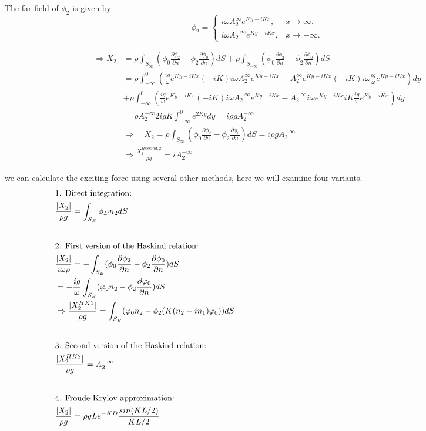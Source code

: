 \documentclass[a4paper,10pt]{article}
\newcommand{\dd}{\partial}
\begin{document}
The far field of $\phi_2$ is given by
\begin{equation} \label{int.eq.}
	\phi_2 = \begin{cases}
		i \omega A_2^\infty e^{Ky - iKx}, & x \rightarrow \infty.\\
		i \omega A_2^{-\infty} e^{Ky + iKx}, & x \rightarrow -\infty.
	\end{cases} 
\end{equation}

\begin{align}
\Rightarrow X_2 &= \rho \int_{S_\infty} (\phi_0 \frac{\dd \phi_2}{\dd n} - \phi_2 \frac{\dd \phi_0}{\dd n}) dS + \rho \int_{S_{-\infty}} (\phi_0 \frac{\dd \phi_2}{\dd n} - \phi_2 \frac{\dd \phi_0}{\dd n}) dS\\
& = \rho \int_{-\infty}^0 (\frac{i g}{\omega} e^{Ky-iKx} (-iK) i \omega A_2^\infty e^{Ky -iKx} - A_2^\infty e^{Ky -iKx}(-iK) i \omega \frac{ig}{\omega} e^{Ky-iKx}) dy\\
& + \rho \int_{-\infty}^0 (\frac{ig}{\omega}e^{Ky-iKx} (-iK) i\omega A_2^{-\infty} e^{Ky+iKx} -A_2^{-\infty} i \omega e^{Ky+iKx} iK \frac{ig}{\omega} e^{Ky-iKx} ) dy\\
& = \rho A_2^{-\infty} 2 ig K \int_{-\infty}^0 e^{2Ky} dy = i \rho g A_2^{- \infty}\\
&\Rightarrow \quad X_2 = \rho \int_{S_\infty} (\phi_0 \frac{\dd \phi_2}{\dd n} - \phi_2 \frac{\dd \phi_0}{\dd n}) dS = i \rho g A_2^{-\infty}\\
& \Rightarrow \frac{X_2^{Haskind, 2}}{\rho g} = i A_2^{- \infty}
\end{align}

we can calculate the exciting force using several other methods, here we will examine four variants.\\[1 em]

\begin{alignat}{3}
&\text{1. Direct integration:} \nonumber \hspace{14 cm}\\
&\frac{\vert X_2 \vert}{\rho g} = \int_{S_B} \phi_D n_2 dS\\[2 em]
&\text{2. First version of the Haskind relation:}\nonumber\\
&\frac{| X_2 |}{i \omega \rho} = -\int_{S_B} (\phi_0 \frac{\dd \phi_2}{\dd n} - \phi_2 \frac{\dd \phi_0}{\dd n}) dS\\
& = - \frac{i g}{\omega} \int_{S_B} (\varphi_0 n_2 - \phi_2 \frac{\dd \varphi_0}{\dd n}) dS\\
& \Rightarrow \frac{|X_2^{HK1}|}{\rho g} = \int_{S_B} (\varphi_0 n_2 - \phi_2 (K(n_2 - in_1)\varphi_0) ) dS\\[2 em]
&\text{3. Second version of the Haskind relation:}\nonumber\\
&\frac{| X_2^{HK2}|}{\rho g} = A_2^{-\infty}\\[2 em]
&\text{4. Froude-Krylov approximation:}\nonumber\\
&\frac{|X_2|}{\rho g} = \rho g L e^{-KD} \frac{sin(KL/2)}{KL/2}
\end{alignat}
\end{document}
